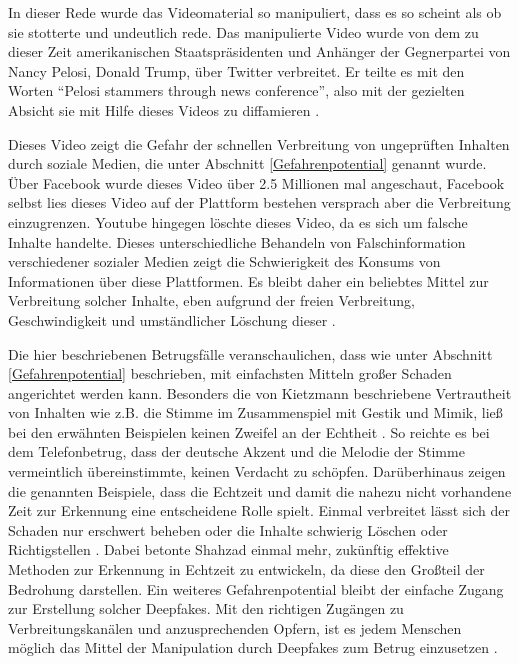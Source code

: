 In dieser Rede wurde das Videomaterial so manipuliert, dass es so scheint als ob sie stotterte und undeutlich rede.
Das manipulierte Video wurde von dem zu dieser Zeit amerikanischen Staatspräsidenten und Anhänger der Gegnerpartei von Nancy Pelosi, Donald Trump, über Twitter verbreitet.
Er teilte es mit den Worten ``Pelosi stammers through news conference'', also mit der gezielten Absicht sie mit Hilfe dieses Videos zu diffamieren \citep[][]{Mervosh2019}.
\par
Dieses Video zeigt die Gefahr der schnellen Verbreitung von ungeprüften Inhalten durch soziale Medien, die unter Abschnitt \ref{Gefahrenpotential} genannt wurde.
Über Facebook wurde dieses Video über 2.5 Millionen mal angeschaut, Facebook selbst lies dieses Video auf der Plattform bestehen versprach aber die Verbreitung einzugrenzen.
Youtube hingegen löschte dieses Video, da es sich um falsche Inhalte handelte.
Dieses unterschiedliche Behandeln von Falschinformation verschiedener sozialer Medien zeigt die Schwierigkeit des Konsums von Informationen über diese Plattformen.
Es bleibt daher ein beliebtes Mittel zur Verbreitung solcher Inhalte, eben aufgrund der freien Verbreitung, Geschwindigkeit und umständlicher Löschung dieser \citep[][]{Appel2022}.
\par
Die hier beschriebenen Betrugsfälle veranschaulichen, dass wie unter Abschnitt \ref{Gefahrenpotential} beschrieben, mit einfachsten Mitteln großer Schaden angerichtet werden kann.
Besonders die von Kietzmann beschriebene Vertrautheit von Inhalten wie z.B. die Stimme im Zusammenspiel mit Gestik und Mimik, ließ bei den erwähnten Beispielen keinen Zweifel an der Echtheit \citep[][]{Kietzmann2020}.
So reichte es bei dem Telefonbetrug, dass der deutsche Akzent und die Melodie der Stimme vermeintlich übereinstimmte, keinen Verdacht zu schöpfen.
Darüberhinaus zeigen die genannten Beispiele, dass die Echtzeit und damit die nahezu nicht vorhandene Zeit zur Erkennung eine entscheidene Rolle spielt.
Einmal verbreitet lässt sich der Schaden nur erschwert beheben oder die Inhalte schwierig Löschen oder Richtigstellen \citep[][]{Shahzad2022}.
Dabei betonte Shahzad einmal mehr, zukünftig effektive Methoden zur Erkennung in Echtzeit zu entwickeln, da diese den Großteil der Bedrohung darstellen.
Ein weiteres Gefahrenpotential bleibt der einfache Zugang zur Erstellung solcher Deepfakes.
Mit den richtigen Zugängen zu Verbreitungskanälen und anzusprechenden Opfern, ist es jedem Menschen möglich das Mittel der Manipulation durch Deepfakes zum Betrug einzusetzen \citep[][]{Appel2022}.